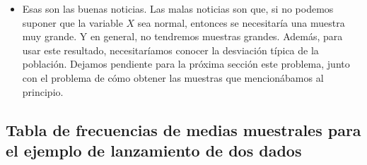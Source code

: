\begin{itemize}
    \item  Esas son las buenas noticias. Las malas noticias son que, si no podemos suponer que la variable $X$ sea normal, entonces se necesitaría una muestra muy grande. Y en general, no tendremos muestras grandes. Además, para usar este resultado, necesitaríamos conocer la desviación típica de la población. Dejamos pendiente para la próxima sección este problema, junto con el problema de cómo obtener las muestras que mencionábamos al principio.


\end{itemize}

%


\subsection*{Tabla de frecuencias de medias muestrales para el ejemplo de lanzamiento de dos dados}\label{subsec:TablaFrecuenciasMediasMuestrales}


